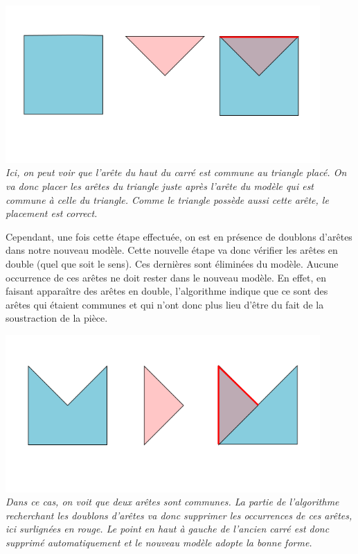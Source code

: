 \documentclass[a4paper, 11pt]{report}
\begin{document}
		\begin{center}
			\includegraphics[width=12cm]{soustraction_arete_1}\\
			\emph{Ici, on peut voir que l'arête du haut du carré est commune au triangle placé. On va donc placer les arêtes du triangle juste après l'arête du modèle qui est commune à celle du triangle. Comme le triangle possède aussi cette arête, le placement est correct.\\}
		\end{center}
		
		Cependant, une fois cette étape effectuée, on est en présence de doublons d'arêtes dans notre nouveau modèle. Cette nouvelle étape va donc vérifier les arêtes en double (quel que soit le sens). Ces dernières sont éliminées du modèle. Aucune occurrence de ces arêtes ne doit rester dans le nouveau modèle. En effet, en faisant apparaître des arêtes en double, l'algorithme indique que ce sont des arêtes qui étaient communes et qui n'ont donc plus lieu d'être du fait de la soustraction de la pièce.\\
		
		\begin{center}
			\includegraphics[width=12cm]{soustraction_arete_2}\\
			\emph{Dans ce cas, on voit que deux arêtes sont communes. La partie de l'algorithme recherchant les doublons d'arêtes va donc supprimer les occurrences de ces arêtes, ici surlignées en rouge. Le point en haut à gauche de l'ancien carré est donc supprimé automatiquement et le nouveau modèle adopte la bonne forme.}
		\end{center}
		
\end{document}
